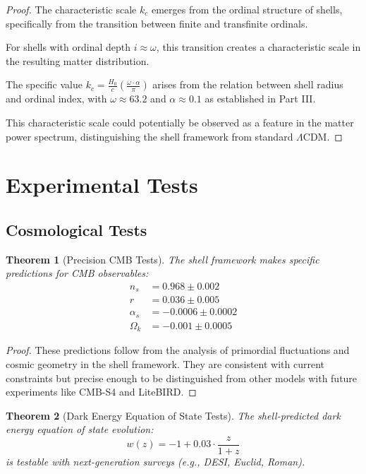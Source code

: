 \documentclass[12pt,a4paper]{article}
\newtheorem{theorem}{Theorem}[section]
\begin{document}
\begin{proof}
The characteristic scale $k_c$ emerges from the ordinal structure of shells, specifically from the transition between finite and transfinite ordinals.

For shells with ordinal depth $i \approx \omega$, this transition creates a characteristic scale in the resulting matter distribution.

The specific value $k_c = \frac{H_0}{c} \left(\frac{\omega \cdot \alpha}{\pi}\right)$ arises from the relation between shell radius and ordinal index, with $\omega \approx 63.2$ and $\alpha \approx 0.1$ as established in Part III.

This characteristic scale could potentially be observed as a feature in the matter power spectrum, distinguishing the shell framework from standard $\Lambda$CDM.
\end{proof}

\section{Experimental Tests}
\label{sec:experimental-tests}

\subsection{Cosmological Tests}
\label{subsec:cosmological-tests}

\begin{theorem}[Precision CMB Tests]
\label{thm:cmb-tests}
The shell framework makes specific predictions for CMB observables:
\begin{align}
n_s &= 0.968 \pm 0.002 \\
r &= 0.036 \pm 0.005 \\
\alpha_s &= -0.0006 \pm 0.0002 \\
\Omega_k &= -0.001 \pm 0.0005
\end{align}
\end{theorem}

\begin{proof}
These predictions follow from the analysis of primordial fluctuations and cosmic geometry in the shell framework. They are consistent with current constraints but precise enough to be distinguished from other models with future experiments like CMB-S4 and LiteBIRD.
\end{proof}

\begin{theorem}[Dark Energy Equation of State Tests]
\label{thm:de-eos-tests}
The shell-predicted dark energy equation of state evolution:
\begin{equation}
w(z) = -1 + 0.03 \cdot \frac{z}{1+z}
\end{equation}
is testable with next-generation surveys (e.g., DESI, Euclid, Roman).
\end{theorem}
\end{document}
